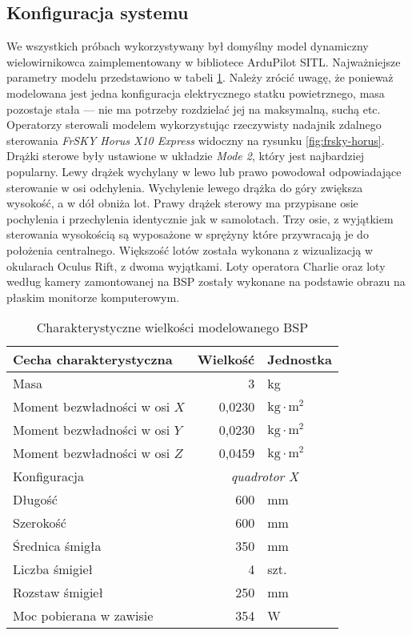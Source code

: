 \subsection{Konfiguracja systemu}
We wszystkich próbach wykorzystywany był domyślny model dynamiczny wielowirnikowca zaimplementowany w bibliotece ArduPilot SITL\cite{sitl-model}. Najważniejsze parametry modelu przedstawiono w tabeli \ref{tab:sitl-model}. Należy zrócić uwagę, że ponieważ modelowana jest jedna konfiguracja elektrycznego statku powietrznego, masa pozostaje stała --- nie ma potrzeby rozdzielać jej na maksymalną, suchą etc. Operatorzy sterowali modelem wykorzystując rzeczywisty nadajnik zdalnego sterowania \emph{FrSKY Horus X10 Express} widoczny na rysunku \ref{fig:frsky-horus}. Drążki sterowe były ustawione w układzie \emph{Mode 2}, który jest najbardziej popularny\cite{mcnabb2021}. Lewy drążek wychylany w lewo lub prawo powodował odpowiadające sterowanie w osi odchylenia. Wychylenie lewego drążka do góry zwiększa wysokość, a w dół obniża lot. Prawy drążek sterowy ma przypisane osie pochylenia i przechylenia identycznie jak w samolotach. Trzy osie, z wyjątkiem sterowania wysokością są wyposażone w sprężyny które przywracają je do położenia centralnego. Większość lotów została wykonana z wizualizacją w okularach Oculus Rift, z dwoma wyjątkami. Loty operatora Charlie oraz loty według kamery zamontowanej na BSP zostały wykonane na podstawie obrazu na płaskim monitorze komputerowym.
\begin{table}[!h] \centering
    \caption{Charakterystyczne wielkości modelowanego BSP}
    \label{tab:sitl-model}

    \begin{tabular}{|l | r|l |}
    \hline
    Cecha charakterystyczna & Wielkość & Jednostka \\ \hline \hline
    Masa & 3 & kg \\ \hline
    Moment bezwładności w osi $ X $ & 0,0230 & $ \text{kg}\cdot\text{m}^2 $ \\ \hline
    Moment bezwładności w osi $ Y $ & 0,0230 & $ \text{kg}\cdot\text{m}^2 $ \\ \hline
    Moment bezwładności w osi $ Z $ & 0,0459 & $ \text{kg}\cdot\text{m}^2 $ \\ \hline
    Konfiguracja & \multicolumn{2}{c|}{\emph{quadrotor X}} \\ \hline
    Długość & 600 & mm \\ \hline
    Szerokość & 600 & mm \\ \hline
    Średnica śmigła & 350 & mm \\ \hline
    Liczba śmigieł & 4 & szt. \\ \hline
    Rozstaw śmigieł & 250 & mm \\ \hline
    Moc pobierana w zawisie & 354 & W \\ \hline
  \end{tabular}
\end{table}

